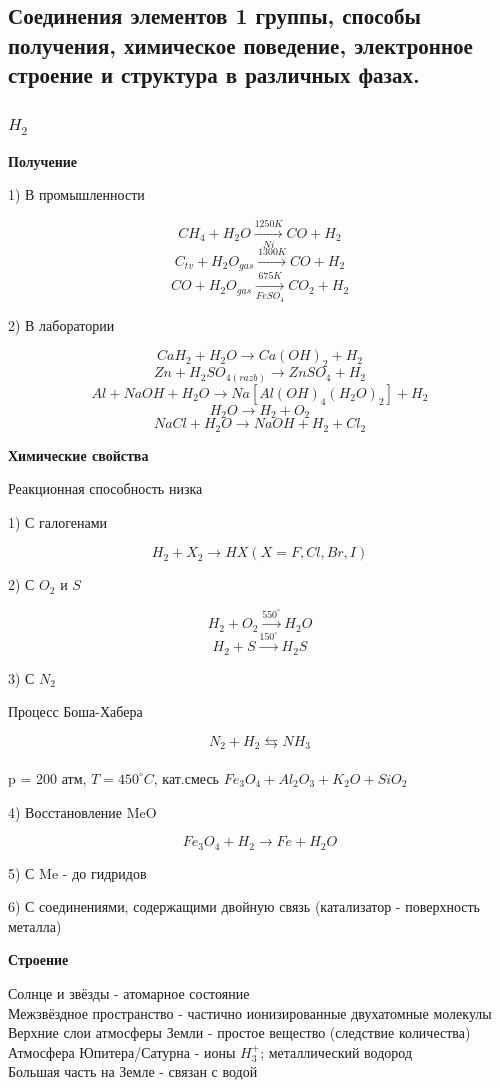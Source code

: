 
\subsection{Соединения элементов 1 группы, способы получения, химическое поведение, электронное строение и структура в различных фазах.}

\subsubsection*{$H_2$}

\textbf{Получение}

1) В промышленности

$$CH_4 + H_2O \xrightarrow[Ni]{1250K} CO + H_2$$
$$C_{tv} + H_2O_{gas} \xrightarrow{1300K} CO + H_2$$
$$CO + H_2O_{gas} \xrightarrow[FeSO_4]{675K} CO_2 + H_2$$

2) В лаборатории

$$CaH_2 + H_2O \rightarrow Ca(OH)_2 + H_2$$
$$Zn + H_2SO_{4(razb)} \rightarrow ZnSO_4 + H_2$$
$$Al + NaOH + H_2O \rightarrow Na[Al(OH)_4(H_2O)_2] + H_2$$
$$H_2O \rightarrow H_2 + O_2$$
$$NaCl + H_2O \rightarrow NaOH + H_2 + Cl_2$$

\textbf{Химические свойства}

Реакционная способность низка

1) С галогенами

$$H_2 + X_2 \rightarrow HX(X = F, Cl, Br, I)$$

2) С $O_2$ и $S$

$$H_2 + O_2 \xrightarrow{550^{\circ}} H_2O$$
$$H_2 + S \xrightarrow{150^{\circ}} H_2S$$

3) С $N_2$

Процесс Боша-Хабера

$$N_2 + H_2 \leftrightarrows NH_3$$\\
p = 200 атм, $T = 450^{\circ}C$, кат.смесь $Fe_3O_4 + Al_2O_3 + K_2O + SiO_2$

4) Восстановление MeO

$$Fe_3O_4  + H_2 \rightarrow Fe + H_2O$$

5) С Me - до гидридов

6) С соединениями, содержащими двойную связь (катализатор - поверхность металла)

\textbf{Строение}

Солнце и звёзды - атомарное состояние\\
Межзвёздное пространство - частично ионизированные двухатомные молекулы\\
Верхние слои атмосферы Земли - простое вещество (следствие количества)\\
Атмосфера Юпитера/Сатурна - ионы $H_3^+$; металлический водород\\
Большая часть на Земле - связан с водой

